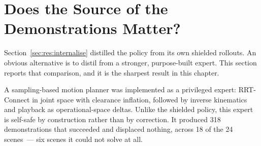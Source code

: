 \documentclass[a4paper,11pt]{report}
\begin{document}
%
%
%
%
\section{Does the Source of the Demonstrations Matter?}\label{sec:res:source}

Section~\ref{sec:res:internalise} distilled the policy from its own shielded rollouts. An obvious
alternative is to distil from a stronger, purpose-built expert. This section reports that
comparison, and it is the sharpest result in this chapter.

A sampling-based motion planner was implemented as a privileged expert: RRT-Connect in joint space
with clearance inflation, followed by inverse kinematics and playback as operational-space deltas.
Unlike the shielded policy, this expert is self-safe by construction rather than by correction. It
produced 318 demonstrations that succeeded and displaced nothing, across 18 of the 24 scenes~---
six scenes it could not solve at all.
\end{document}
